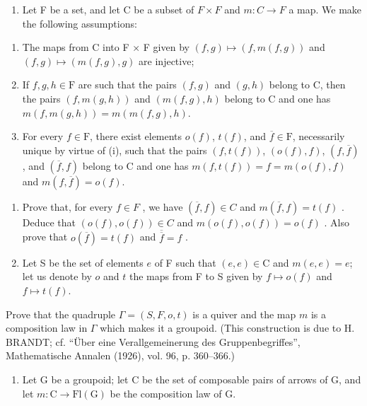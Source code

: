 \begin{enumerate}
\def\labelenumi{\arabic{enumi})}
\setcounter{enumi}{9}
\tightlist
\item
  Let F be a set, and let C be a subset of \(F \times F\) and \(m: C \to F\) a map. We make the following assumptions:
\end{enumerate}

\begin{enumerate}
\def\labelenumi{(\roman{enumi})}
\item
  The maps from C into F × F given by \((f,g)\mapsto(f,m(f,g))\) and \((f,g)\mapsto(m(f,g),g)\) are injective;
\item
  If \(f, g, h \in \mathrm{F}\) are such that the pairs \((f, g)\) and \((g, h)\) belong to C, then the pairs \((f, m(g, h))\) and \((m(f, g), h)\) belong to C and one has \(m(f, m(g, h)) = m(m(f, g), h)\).
\item
  For every \(f \in \mathrm{F}\), there exist elements \(o(f)\), \(t(f)\), and \(\overline{f} \in \mathrm{F}\), necessarily unique by virtue of (i), such that the pairs \((f, t(f))\), \((o(f), f)\), \((f, \overline{f})\), and \((\overline{f}, f)\) belong to C and one has \(m(f, t(f)) = f = m(o(f), f)\) and \(m(f, \overline{f}) = o(f)\).
\end{enumerate}

\begin{enumerate}
\def\labelenumi{\alph{enumi})}
\item
  Prove that, for every \(f \in F\) , we have \((\overline{f}, f) \in C\) and \(m(\overline{f}, f) = t(f)\) . Deduce that \((o(f), o(f)) \in C\) and \(m(o(f), o(f)) = o(f)\) . Also prove that \(o(\overline{f}) = t(f)\) and \(\overline{\overline{f}} = f\) .
\item
  Let S be the set of elements \(e\) of F such that \((e,e)\in\mathrm{C}\) and \(m(e,e)=e\); let us denote by \(o\) and \(t\) the maps from F to S given by \(f\mapsto o(f)\) and \(f\mapsto t(f)\).
\end{enumerate}

Prove that the quadruple \(\Gamma = (S, F, o, t)\) is a quiver and the map \(m\) is a composition law in \(\Gamma\) which makes it a groupoid. (This construction is due to H. BRANDT; cf. “Über eine Verallgemeinerung des Gruppenbegriffes”, Mathematische Annalen (1926), vol. 96, p. 360–366.)

\begin{enumerate}
\def\labelenumi{\arabic{enumi})}
\setcounter{enumi}{10}
\tightlist
\item
  Let G be a groupoid; let C be the set of composable pairs of arrows of G, and let \(m\colon\mathrm{C}\to\mathrm{Fl}(\mathrm{G})\) be the composition law of G.
\end{enumerate}

